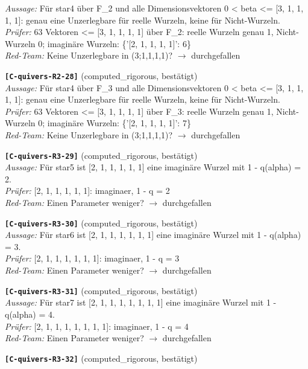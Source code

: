 \documentclass[11pt]{article}
\theoremstyle{definition}\newtheorem{definition}[theorem]{Definition}\newtheorem{remark}[theorem]{Remark}\newtheorem{observation}[theorem]{Numerical observation}
\begin{document}
\textit{Aussage:} Für star4 über F\_2 und alle Dimensionsvektoren 0 < beta <= [3, 1, 1, 1, 1]: genau eine Unzerlegbare für reelle Wurzeln, keine für Nicht-Wurzeln.\\
\textit{Prüfer:} 63 Vektoren <= [3, 1, 1, 1, 1] über F\_2: reelle Wurzeln genau 1, Nicht-Wurzeln 0; imaginäre Wurzeln: \{'[2, 1, 1, 1, 1]': 6\}\\
\textit{Red-Team:} Keine Unzerlegbare in (3;1,1,1,1)? $\to$ durchgefallen\par\medskip
\noindent\textbf{\texttt{[C-quivers-R2-28]}} (computed\_rigorous, bestätigt)\\
\textit{Aussage:} Für star4 über F\_3 und alle Dimensionsvektoren 0 < beta <= [3, 1, 1, 1, 1]: genau eine Unzerlegbare für reelle Wurzeln, keine für Nicht-Wurzeln.\\
\textit{Prüfer:} 63 Vektoren <= [3, 1, 1, 1, 1] über F\_3: reelle Wurzeln genau 1, Nicht-Wurzeln 0; imaginäre Wurzeln: \{'[2, 1, 1, 1, 1]': 7\}\\
\textit{Red-Team:} Keine Unzerlegbare in (3;1,1,1,1)? $\to$ durchgefallen\par\medskip
\noindent\textbf{\texttt{[C-quivers-R3-29]}} (computed\_rigorous, bestätigt)\\
\textit{Aussage:} Für star5 ist [2, 1, 1, 1, 1, 1] eine imaginäre Wurzel mit 1 - q(alpha) = 2.\\
\textit{Prüfer:} [2, 1, 1, 1, 1, 1]: imaginaer, 1 - q = 2\\
\textit{Red-Team:} Einen Parameter weniger? $\to$ durchgefallen\par\medskip
\noindent\textbf{\texttt{[C-quivers-R3-30]}} (computed\_rigorous, bestätigt)\\
\textit{Aussage:} Für star6 ist [2, 1, 1, 1, 1, 1, 1] eine imaginäre Wurzel mit 1 - q(alpha) = 3.\\
\textit{Prüfer:} [2, 1, 1, 1, 1, 1, 1]: imaginaer, 1 - q = 3\\
\textit{Red-Team:} Einen Parameter weniger? $\to$ durchgefallen\par\medskip
\noindent\textbf{\texttt{[C-quivers-R3-31]}} (computed\_rigorous, bestätigt)\\
\textit{Aussage:} Für star7 ist [2, 1, 1, 1, 1, 1, 1, 1] eine imaginäre Wurzel mit 1 - q(alpha) = 4.\\
\textit{Prüfer:} [2, 1, 1, 1, 1, 1, 1, 1]: imaginaer, 1 - q = 4\\
\textit{Red-Team:} Einen Parameter weniger? $\to$ durchgefallen\par\medskip
\noindent\textbf{\texttt{[C-quivers-R3-32]}} (computed\_rigorous, bestätigt)\\
\end{document}
